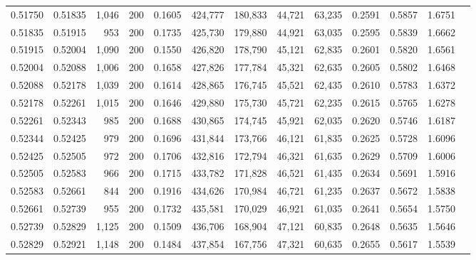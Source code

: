 \begin{tabular}{rrrrrrrrrrrrr}
0.51750 & 0.51835 & 1,046 & 200 &                                     0.1605 & 424,777 & 180,833 &  44,721 &  63,235 & 0.2591 & 0.5857 & 1.6751 \\
0.51835 & 0.51915 &   953 & 200 &                                     0.1735 & 425,730 & 179,880 &  44,921 &  63,035 & 0.2595 & 0.5839 & 1.6662 \\
0.51915 & 0.52004 & 1,090 & 200 &                                     0.1550 & 426,820 & 178,790 &  45,121 &  62,835 & 0.2601 & 0.5820 & 1.6561 \\
0.52004 & 0.52088 & 1,006 & 200 &                                     0.1658 & 427,826 & 177,784 &  45,321 &  62,635 & 0.2605 & 0.5802 & 1.6468 \\
0.52088 & 0.52178 & 1,039 & 200 &                                     0.1614 & 428,865 & 176,745 &  45,521 &  62,435 & 0.2610 & 0.5783 & 1.6372 \\
0.52178 & 0.52261 & 1,015 & 200 &                                     0.1646 & 429,880 & 175,730 &  45,721 &  62,235 & 0.2615 & 0.5765 & 1.6278 \\
0.52261 & 0.52343 &   985 & 200 &                                     0.1688 & 430,865 & 174,745 &  45,921 &  62,035 & 0.2620 & 0.5746 & 1.6187 \\
0.52344 & 0.52425 &   979 & 200 &                                     0.1696 & 431,844 & 173,766 &  46,121 &  61,835 & 0.2625 & 0.5728 & 1.6096 \\
0.52425 & 0.52505 &   972 & 200 &                                     0.1706 & 432,816 & 172,794 &  46,321 &  61,635 & 0.2629 & 0.5709 & 1.6006 \\
0.52505 & 0.52583 &   966 & 200 &                                     0.1715 & 433,782 & 171,828 &  46,521 &  61,435 & 0.2634 & 0.5691 & 1.5916 \\
0.52583 & 0.52661 &   844 & 200 &                                     0.1916 & 434,626 & 170,984 &  46,721 &  61,235 & 0.2637 & 0.5672 & 1.5838 \\
0.52661 & 0.52739 &   955 & 200 &                                     0.1732 & 435,581 & 170,029 &  46,921 &  61,035 & 0.2641 & 0.5654 & 1.5750 \\
0.52739 & 0.52829 & 1,125 & 200 &                                     0.1509 & 436,706 & 168,904 &  47,121 &  60,835 & 0.2648 & 0.5635 & 1.5646 \\
0.52829 & 0.52921 & 1,148 & 200 &                                     0.1484 & 437,854 & 167,756 &  47,321 &  60,635 & 0.2655 & 0.5617 & 1.5539 \\

\end{tabular}
